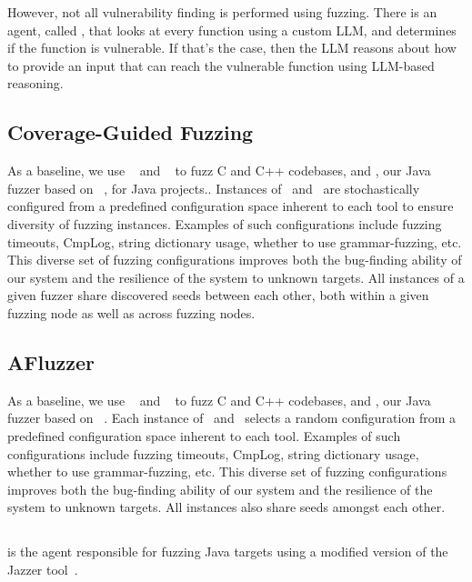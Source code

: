 However, not all vulnerability finding is performed using fuzzing.
There is an agent, called \lluminar, that looks at every function using a custom LLM, and determines if the function is vulnerable.
If that's the case, then the LLM reasons about how to provide an input that can reach the vulnerable function using LLM-based reasoning.

\subsection{Coverage-Guided Fuzzing}
As a baseline, we use \afl~\cite{aflplusplus} and \libfuzzer~\cite{libfuzzer} to fuzz C and C++ codebases, and \jazzmine{}, our Java fuzzer based on \jazzer~\cite{jazzer}, for Java projects..
Instances of \afl\ and \jazzmine\ are stochastically configured from a predefined configuration space inherent to each tool to ensure diversity of fuzzing instances.
Examples of such configurations include fuzzing timeouts, CmpLog\cite{aschermann2019redqueen}, string dictionary usage, whether to use grammar-fuzzing, etc.
This diverse set of fuzzing configurations improves both the bug-finding ability of our system and the resilience of the system to unknown targets.
All instances of a given fuzzer share discovered seeds between each other, both within a given fuzzing node as well as across fuzzing nodes.

\subsection{AFluzzer}
\label{afluzzer}

As a baseline, we use \afl~\cite{aflplusplus} and \libfuzzer~\cite{libfuzzer} to fuzz C and C++ codebases, and \jazzmine{}, our Java fuzzer based on \jazzer~\cite{jazzer}.
Each instance of \afl\ and \jazzmine\ selects a random configuration from a predefined configuration space inherent to each tool.
Examples of such configurations include fuzzing timeouts, CmpLog\cite{aschermann2019redqueen}, string dictionary usage, whether to use grammar-fuzzing, etc.
This diverse set of fuzzing configurations improves both the bug-finding ability of our system and the resilience of the system to unknown targets.
All instances also share seeds amongst each other.

\subsection{\jazzmine}

\jazzmine is the agent responsible for fuzzing Java targets using a modified version of the Jazzer tool~\cite{jazzer}.

